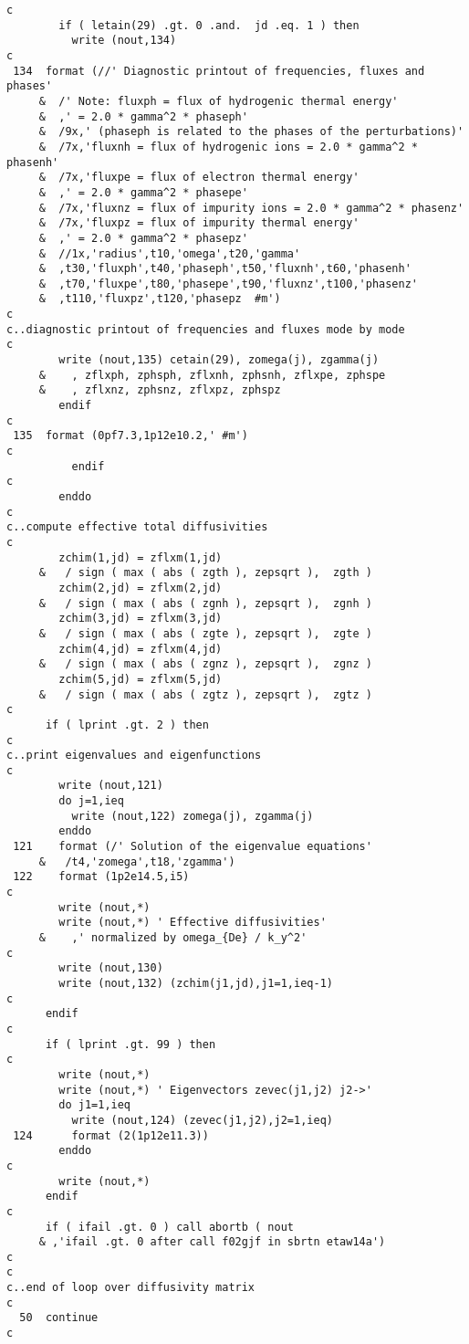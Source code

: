 \begin{verbatim}
c
        if ( letain(29) .gt. 0 .and.  jd .eq. 1 ) then
          write (nout,134)
c
 134  format (//' Diagnostic printout of frequencies, fluxes and phases'
     &  /' Note: fluxph = flux of hydrogenic thermal energy'
     &  ,' = 2.0 * gamma^2 * phaseph'
     &  /9x,' (phaseph is related to the phases of the perturbations)'
     &  /7x,'fluxnh = flux of hydrogenic ions = 2.0 * gamma^2 * phasenh'
     &  /7x,'fluxpe = flux of electron thermal energy'
     &  ,' = 2.0 * gamma^2 * phasepe'
     &  /7x,'fluxnz = flux of impurity ions = 2.0 * gamma^2 * phasenz'
     &  /7x,'fluxpz = flux of impurity thermal energy'
     &  ,' = 2.0 * gamma^2 * phasepz'
     &  //1x,'radius',t10,'omega',t20,'gamma'
     &  ,t30,'fluxph',t40,'phaseph',t50,'fluxnh',t60,'phasenh'
     &  ,t70,'fluxpe',t80,'phasepe',t90,'fluxnz',t100,'phasenz'
     &  ,t110,'fluxpz',t120,'phasepz  #m')
c
c..diagnostic printout of frequencies and fluxes mode by mode
c
        write (nout,135) cetain(29), zomega(j), zgamma(j)
     &    , zflxph, zphsph, zflxnh, zphsnh, zflxpe, zphspe
     &    , zflxnz, zphsnz, zflxpz, zphspz
        endif
c
 135  format (0pf7.3,1p12e10.2,' #m')
c
          endif
c
        enddo
c
c..compute effective total diffusivities
c
        zchim(1,jd) = zflxm(1,jd)
     &   / sign ( max ( abs ( zgth ), zepsqrt ),  zgth )
        zchim(2,jd) = zflxm(2,jd)
     &   / sign ( max ( abs ( zgnh ), zepsqrt ),  zgnh )
        zchim(3,jd) = zflxm(3,jd)
     &   / sign ( max ( abs ( zgte ), zepsqrt ),  zgte )
        zchim(4,jd) = zflxm(4,jd)
     &   / sign ( max ( abs ( zgnz ), zepsqrt ),  zgnz )
        zchim(5,jd) = zflxm(5,jd)
     &   / sign ( max ( abs ( zgtz ), zepsqrt ),  zgtz )
c
      if ( lprint .gt. 2 ) then
c
c..print eigenvalues and eigenfunctions
c
        write (nout,121)
        do j=1,ieq
          write (nout,122) zomega(j), zgamma(j)
        enddo
 121    format (/' Solution of the eigenvalue equations'
     &   /t4,'zomega',t18,'zgamma')
 122    format (1p2e14.5,i5)
c
        write (nout,*)
        write (nout,*) ' Effective diffusivities'
     &    ,' normalized by omega_{De} / k_y^2'
c
        write (nout,130)
        write (nout,132) (zchim(j1,jd),j1=1,ieq-1)
c
      endif
c
      if ( lprint .gt. 99 ) then
c
        write (nout,*)
        write (nout,*) ' Eigenvectors zevec(j1,j2) j2->'
        do j1=1,ieq
          write (nout,124) (zevec(j1,j2),j2=1,ieq)
 124      format (2(1p12e11.3))
        enddo
c
        write (nout,*)
      endif
c
      if ( ifail .gt. 0 ) call abortb ( nout
     & ,'ifail .gt. 0 after call f02gjf in sbrtn etaw14a')
c
c
c..end of loop over diffusivity matrix
c
  50  continue
c
\end{verbatim}


